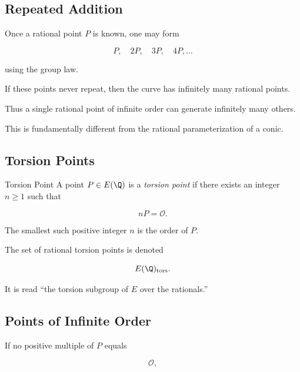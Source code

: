 \subsection{Repeated Addition}
\label{subsec:elliptic-repeated-addition}

Once a rational point \(P\) is known, one may form

\[ P,\quad2P,\quad3P,\quad4P,\ldots \]

using the group law.

If these points never repeat, then the curve has infinitely many rational
points.

Thus a single rational point of infinite order can generate infinitely many
others.

This is fundamentally different from the rational parameterization of a
conic.

\subsection{Torsion Points}
\label{subsec:elliptic-torsion-points}

\begin{definitionbox}{Torsion Point}
A point \(P\in E(\Q)\) is a \emph{torsion point} if there exists an integer
\(n\geq1\) such that

\[ \boxed{nP=\mathcal O.} \]
\end{definitionbox}

The smallest such positive integer \(n\) is the order of \(P\).

The set of rational torsion points is denoted

\[ E(\Q)_{\mathrm{tors}}. \]

It is read ``the torsion subgroup of \(E\) over the rationals.''

\subsection{Points of Infinite Order}
\label{subsec:elliptic-infinite-order}

If no positive multiple of \(P\) equals

\[ \mathcal O, \]


